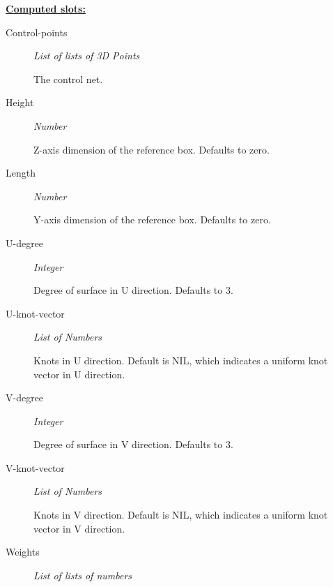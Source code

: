 \documentclass [11pt]{book}
\begin{document}
\begin{itemize}
\begin{description}
\end{description}






\textbf{
\underline{Computed slots:}}

\begin{description}

\item [Control-points]
\emph{List of lists of 3D Points}

 The control net.




\item [Height]
\emph{Number}

 Z-axis dimension of the reference box. Defaults to zero.




\item [Length]
\emph{Number}

 Y-axis dimension of the reference box. Defaults to zero.




\item [U-degree]
\emph{Integer}

 Degree of surface in U direction. Defaults to 3.




\item [U-knot-vector]
\emph{List of Numbers}

 Knots in U direction. Default is NIL, which indicates a uniform knot vector in U direction.




\item [V-degree]
\emph{Integer}

 Degree of surface in V direction. Defaults to 3.




\item [V-knot-vector]
\emph{List of Numbers}

 Knots in V direction. Default is NIL, which indicates a uniform knot vector in V direction.




\item [Weights]
\emph{List of lists of numbers}


\end{description}
\end{itemize}
\end{document}
